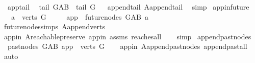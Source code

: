 \begin{isabellebody}
\isanewline
{}\isamarkupfalse%
\ \ app{}{\isacharunderscore}{\kern0pt}tail{\isacharcolon}{\kern0pt}\isanewline
\ \ {\isachardoublequoteopen}tail\ G{\isacharunderscore}{\kern0pt}AB\ {\isacharequal}{\kern0pt}\ tail\ G{\isachardoublequoteclose}%
\isadelimproof
\ %
\endisadelimproof
%
\isatagproof
{}\isamarkupfalse%
\ append{\isacharunderscore}{\kern0pt}tail\ A{}{\isachardot}{\kern0pt}append{\isacharunderscore}{\kern0pt}tail\ \isamarkupfalse%
\ simp%
\endisatagproof
{\isafoldproof}%
%
\isadelimproof
%
\endisadelimproof
\isanewline
\isanewline
{}\isamarkupfalse%
\ app{\isacharunderscore}{\kern0pt}in{\isacharunderscore}{\kern0pt}future{}{\isacharcolon}{\kern0pt}\ \isanewline
\ \ \ {\isachardoublequoteopen}a\ {\isasymin}\ verts\ G{\isachardoublequoteclose}\ \ \isanewline
\ \ \ {\isachardoublequoteopen}app\ {\isasymin}\ future{\isacharunderscore}{\kern0pt}nodes\ G{\isacharunderscore}{\kern0pt}AB\ a{\isachardoublequoteclose}\isanewline
%
\isadelimproof
\ \ %
\endisadelimproof
%
\isatagproof
{}\isamarkupfalse%
\ future{\isacharunderscore}{\kern0pt}nodes{\isachardot}{\kern0pt}simps\ A{}{\isachardot}{\kern0pt}append{\isacharunderscore}{\kern0pt}verts\isanewline
\ \ \isamarkupfalse%
\ app{\isacharunderscore}{\kern0pt}in\ A{}{\isachardot}{\kern0pt}reachable{}{\isacharunderscore}{\kern0pt}preserve\ app{\isacharunderscore}{\kern0pt}in{}\ assms\ reaches{\isacharunderscore}{\kern0pt}all\isanewline
\ \ \isamarkupfalse%
\ simp%
\endisatagproof
{\isafoldproof}%
%
\isadelimproof
\isanewline
%
\endisadelimproof
\isanewline
{}\isamarkupfalse%
\ append{\isacharunderscore}{\kern0pt}past{\isacharunderscore}{\kern0pt}nodes{}{\isacharcolon}{\kern0pt}\isanewline
\ \ {\isachardoublequoteopen}past{\isacharunderscore}{\kern0pt}nodes\ G{\isacharunderscore}{\kern0pt}AB\ app\ {\isacharequal}{\kern0pt}\ verts\ G{\isachardoublequoteclose}\isanewline
%
\isadelimproof
\ \ %
\endisadelimproof
%
\isatagproof
{}\isamarkupfalse%
\ app{\isacharunderscore}{\kern0pt}in\ A{}{\isachardot}{\kern0pt}append{\isacharunderscore}{\kern0pt}past{\isacharunderscore}{\kern0pt}nodes\ append{\isacharunderscore}{\kern0pt}past{\isacharunderscore}{\kern0pt}all\isanewline
\ \ \isamarkupfalse%
\ auto%
\endisatagproof
{\isafoldproof}%
%
\isadelimproof
\ \isanewline
%
\endisadelimproof
\isanewline
\isanewline
{}\isamarkupfalse%

\end{isabellebody}
